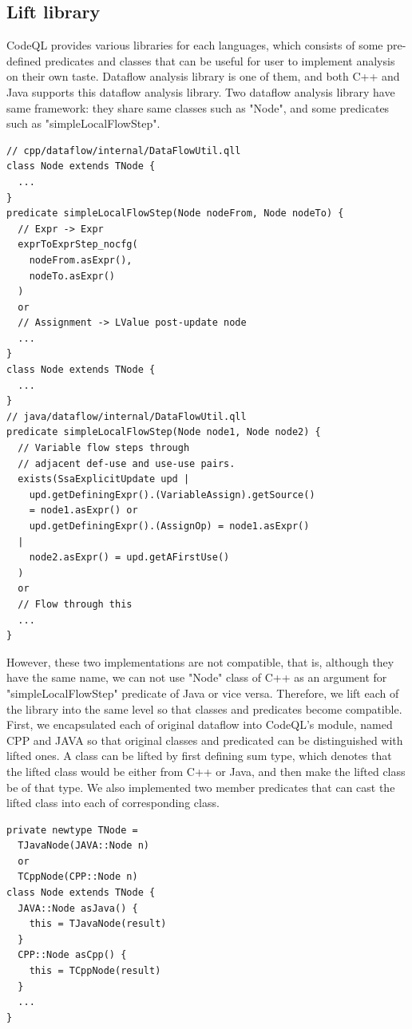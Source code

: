 \subsection{Lift library}
CodeQL provides various libraries for each languages, which consists of some
pre-defined predicates and classes that can be useful for user to implement
analysis on their own taste. Dataflow analysis library is one of them, and both
C++ and Java supports this dataflow analysis library. Two dataflow analysis
library have same framework: they share same classes such as "Node", and some
predicates such as "simpleLocalFlowStep".

\begin{lstlisting}[style=codeql,xleftmargin=2.5em]
// cpp/dataflow/internal/DataFlowUtil.qll
class Node extends TNode {
  ...
}
predicate simpleLocalFlowStep(Node nodeFrom, Node nodeTo) {
  // Expr -> Expr
  exprToExprStep_nocfg(
    nodeFrom.asExpr(),
    nodeTo.asExpr()
  )
  or
  // Assignment -> LValue post-update node
  ...
}
class Node extends TNode {
  ...
}
// java/dataflow/internal/DataFlowUtil.qll
predicate simpleLocalFlowStep(Node node1, Node node2) {
  // Variable flow steps through
  // adjacent def-use and use-use pairs.
  exists(SsaExplicitUpdate upd |
    upd.getDefiningExpr().(VariableAssign).getSource()
    = node1.asExpr() or
    upd.getDefiningExpr().(AssignOp) = node1.asExpr()
  |
    node2.asExpr() = upd.getAFirstUse()
  )
  or
  // Flow through this
  ...
}
\end{lstlisting}
However, these two implementations are not compatible, that is, although they have the same name,
we can not use "Node" class of C++ as an argument for "simpleLocalFlowStep" predicate of Java or vice versa.
Therefore, we lift each of the library into the same level so that classes and predicates become compatible.
First, we encapsulated each of original dataflow into CodeQL's module, named CPP and JAVA so that
original classes and predicated can be distinguished with lifted ones.
A class can be lifted by first defining sum type, which denotes that the lifted class would be either from C++ or
Java, and then make the lifted class be of that type. We also implemented two member predicates that can cast
the lifted class into each of corresponding class.
\begin{lstlisting}[style=codeql,xleftmargin=2.5em]
private newtype TNode =
  TJavaNode(JAVA::Node n)
  or
  TCppNode(CPP::Node n)
class Node extends TNode {
  JAVA::Node asJava() {
    this = TJavaNode(result)
  }
  CPP::Node asCpp() {
    this = TCppNode(result)
  }
  ...
}
\end{lstlisting}

